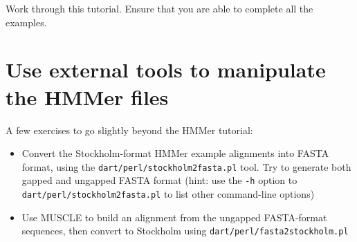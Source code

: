 Work through this tutorial.
Ensure that you are able to complete all the examples.

\section{Use external tools to manipulate the HMMer files}

A few exercises to go slightly beyond the HMMer tutorial:
\begin{itemize}
\item Convert the Stockholm-format HMMer example alignments into FASTA format, using the {\tt dart/perl/stockholm2fasta.pl} tool.
Try to generate both gapped and ungapped FASTA format (hint: use the {\tt -h} option to {\tt dart/perl/stockholm2fasta.pl} to list other command-line options)
\item Use MUSCLE to build an alignment from the ungapped FASTA-format sequences, then convert to Stockholm using {\tt dart/perl/fasta2stockholm.pl}
\end{itemize}
